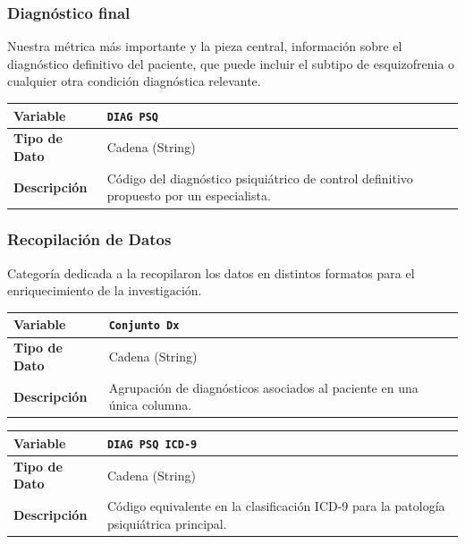 \documentclass[12pt,a4paper,onecolumn,oneside]{report}
\begin{document}
\subsubsection{Diagnóstico final}
Nuestra métrica más importante y la pieza central, información sobre el diagnóstico definitivo del paciente, que puede incluir el subtipo de esquizofrenia o cualquier otra condición diagnóstica relevante.

\noindent
\begin{tabular}{|p{3.5cm}|p{10.5cm}|}
\hline
\rowcolor[RGB]{239,239,239} 
\textbf{Variable} & \textbf{\texttt{DIAG PSQ}} \\ \hline
\textbf{Tipo de Dato} & Cadena (String) \\ \hline
\textbf{Descripción} & Código del diagnóstico psiquiátrico de control definitivo propuesto por un especialista. \\ \hline
\end{tabular}
\label{tab:var_diag_psq}
\vspace{0.4cm}

\subsubsection{Recopilación de Datos}
Categoría dedicada a la recopilaron los datos en distintos formatos para el enriquecimiento de la investigación.

\noindent
\begin{tabular}{|p{3.5cm}|p{10.5cm}|}
\hline
\rowcolor[RGB]{239,239,239} 
\textbf{Variable} & \textbf{\texttt{Conjunto Dx}} \\ \hline
\textbf{Tipo de Dato} & Cadena (String) \\ \hline
\textbf{Descripción} & Agrupación de diagnósticos asociados al paciente en una única columna. \\ \hline
\end{tabular}
\label{tab:var_conjunto_dx}
\vspace{0.4cm}

\noindent
\begin{tabular}{|p{3.5cm}|p{10.5cm}|}
\hline
\rowcolor[RGB]{239,239,239} 
\textbf{Variable} & \textbf{\texttt{DIAG PSQ ICD-9}} \\ \hline
\textbf{Tipo de Dato} & Cadena (String) \\ \hline
\textbf{Descripción} & Código equivalente en la clasificación ICD-9 para la patología psiquiátrica principal. \\ \hline
\end{tabular}
\label{tab:var_icd9}
\vspace{0.4cm}
\end{document}

